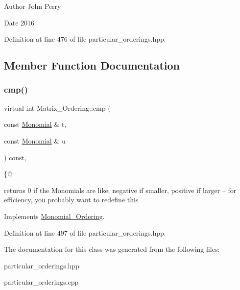 \begin{DoxyAuthor}{Author}
John Perry 
\end{DoxyAuthor}
\begin{DoxyDate}{Date}
2016 
\end{DoxyDate}


Definition at line 476 of file particular\+\_\+orderings.\+hpp.



\subsection{Member Function Documentation}
\mbox{\label{class_matrix___ordering_a8a6423a305facdaf91a1a3921e0b9f73}} 
\subsubsection{\texorpdfstring{cmp()}{cmp()}}
{\footnotesize\ttfamily virtual int Matrix\+\_\+\+Ordering\+::cmp (\begin{DoxyParamCaption}\item[{const \hyperlink{class_monomial}{Monomial} \&}]{t,  }\item[{const \hyperlink{class_monomial}{Monomial} \&}]{u }\end{DoxyParamCaption}) const\hspace{0.3cm}{\ttfamily [inline]}, {\ttfamily [virtual]}}



\{@ 

returns 0 if the Monomials are like; negative if smaller, positive if larger -- for efficiency, you probably want to redefine this 

Implements \hyperlink{class_monomial___ordering_a9bc3155fc98b4d40c26118fa2114b827}{Monomial\+\_\+\+Ordering}.



Definition at line 497 of file particular\+\_\+orderings.\+hpp.



The documentation for this class was generated from the following files\+:\begin{DoxyCompactItemize}
\item 
particular\+\_\+orderings.\+hpp\item 
particular\+\_\+orderings.\+cpp\end{DoxyCompactItemize}
